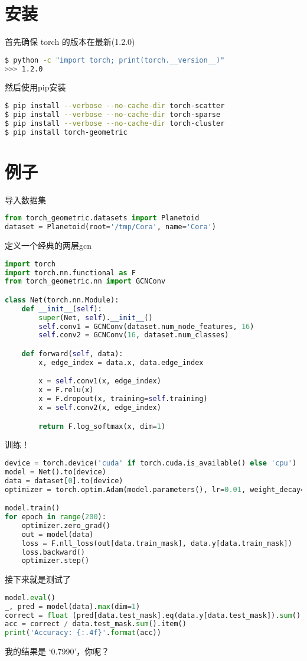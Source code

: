 \documentclass[color=gray,base=hide,cn]{elegantbook}
\begin{document}
\section{安装}
首先确保 torch 的版本在最新(1.2.0)
\begin{lstlisting}[language=sh]
$ python -c "import torch; print(torch.__version__)"
>>> 1.2.0
\end{lstlisting}

然后使用pip安装
\begin{lstlisting}[language=sh]
$ pip install --verbose --no-cache-dir torch-scatter
$ pip install --verbose --no-cache-dir torch-sparse
$ pip install --verbose --no-cache-dir torch-cluster
$ pip install torch-geometric
\end{lstlisting}

\section{例子}
导入数据集
\begin{lstlisting}[language=Python]
from torch_geometric.datasets import Planetoid
dataset = Planetoid(root='/tmp/Cora', name='Cora')
\end{lstlisting}

定义一个经典的两层gcn
\begin{lstlisting}[language=Python]
import torch
import torch.nn.functional as F
from torch_geometric.nn import GCNConv

class Net(torch.nn.Module):
    def __init__(self):
        super(Net, self).__init__()
        self.conv1 = GCNConv(dataset.num_node_features, 16)
        self.conv2 = GCNConv(16, dataset.num_classes)

    def forward(self, data):
        x, edge_index = data.x, data.edge_index

        x = self.conv1(x, edge_index)
        x = F.relu(x)
        x = F.dropout(x, training=self.training)
        x = self.conv2(x, edge_index)

        return F.log_softmax(x, dim=1)
\end{lstlisting}

训练！
\begin{lstlisting}[language=Python]
device = torch.device('cuda' if torch.cuda.is_available() else 'cpu')
model = Net().to(device)
data = dataset[0].to(device)
optimizer = torch.optim.Adam(model.parameters(), lr=0.01, weight_decay=5e-4)

model.train()
for epoch in range(200):
    optimizer.zero_grad()
    out = model(data)
    loss = F.nll_loss(out[data.train_mask], data.y[data.train_mask])
    loss.backward()
    optimizer.step()
\end{lstlisting}

接下来就是测试了
\begin{lstlisting}[language=Python]
model.eval()
_, pred = model(data).max(dim=1)
correct = float (pred[data.test_mask].eq(data.y[data.test_mask]).sum().item())
acc = correct / data.test_mask.sum().item()
print('Accuracy: {:.4f}'.format(acc))
\end{lstlisting}
我的结果是 `0.7990'，你呢？
\end{document}
